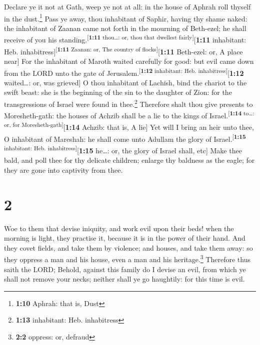  Declare ye it not at Gath, weep ye not at all: in the
house of Aphrah roll thyself in the dust.\footnote{\textbf{1:10} Aphrah:
  that is, Dust}  Pass ye away, thou inhabitant of
Saphir, having thy shame naked: the inhabitant of Zaanan came not forth
in the mourning of Beth-ezel; he shall receive of you his
standing.\textsuperscript{{[}\textbf{1:11} thou\ldots: or, thou that
dwellest fairly{]}}{[}\textbf{1:11} inhabitant: Heb.
inhabitress{]}\textsuperscript{{[}\textbf{1:11} Zaanan: or, The country
of flocks{]}}{[}\textbf{1:11} Beth-ezel: or, A place near{]}
 For the inhabitant of Maroth waited carefully for good:
but evil came down from the LORD unto the gate of
Jerusalem.\textsuperscript{{[}\textbf{1:12} inhabitant: Heb.
inhabitress{]}}{[}\textbf{1:12} waited\ldots: or, was grieved{]}
 O thou inhabitant of Lachish, bind the chariot to the
swift beast: she is the beginning of the sin to the daughter of Zion:
for the transgressions of Israel were found in thee.\footnote{\textbf{1:13}
  inhabitant: Heb. inhabitress}  Therefore shalt thou
give presents to Moresheth-gath: the houses of Achzib shall be a lie to
the kings of Israel.\textsuperscript{{[}\textbf{1:14} to\ldots: or, for
Moresheth-gath{]}}{[}\textbf{1:14} Achzib: that is, A lie{]}
 Yet will I bring an heir unto thee, O inhabitant of
Mareshah: he shall come unto Adullam the glory of
Israel.\textsuperscript{{[}\textbf{1:15} inhabitant: Heb.
inhabitress{]}}{[}\textbf{1:15} he\ldots: or, the glory of Israel shall,
etc{]}  Make thee bald, and poll thee for thy delicate
children; enlarge thy baldness as the eagle; for they are gone into
captivity from thee.

\hypertarget{section-1}{%
\section{2}\label{section-1}}

 Woe to them that devise iniquity, and work evil upon
their beds! when the morning is light, they practise it, because it is
in the power of their hand.  And they covet fields, and
take them by violence; and houses, and take them away: so they oppress a
man and his house, even a man and his heritage.\footnote{\textbf{2:2}
  oppress: or, defraud}  Therefore thus saith the LORD;
Behold, against this family do I devise an evil, from which ye shall not
remove your necks; neither shall ye go haughtily: for this time is evil.

